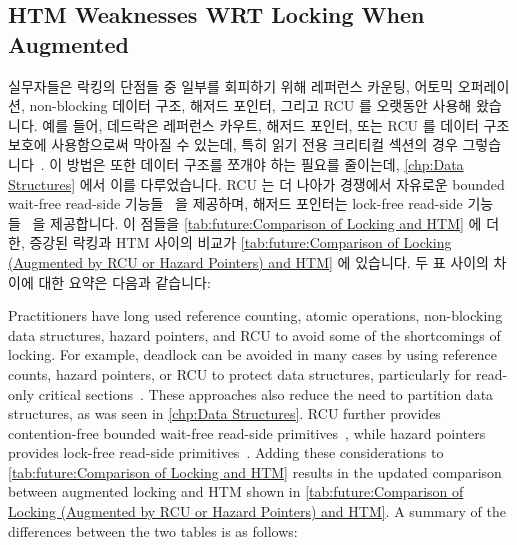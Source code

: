 \fi

\subsection{HTM Weaknesses WRT Locking When Augmented}
\label{sec:future:HTM Weaknesses WRT Locking When Augmented}



실무자들은 락킹의 단점들 중 일부를 회피하기 위해 레퍼런스 카운팅, 어토믹
오퍼레이션, non-blocking 데이터 구조, 해저드 포인터, 그리고 RCU 를 오랫동안
사용해 왔습니다.
예를 들어, 데드락은 레퍼런스 카우트, 해저드 포인터, 또는 RCU 를 데이터 구조
보호에 사용함으로써 막아질 수 있는데, 특히 읽기 전용 크리티컬 섹션의 경우
그렇습니다~\cite{MagedMichael04a,HerlihyLM02,MathieuDesnoyers2012URCU,DinakarGuniguntala2008IBMSysJ,ThomasEHart2007a}.
이 방법은 또한 데이터 구조를 쪼개야 하는 필요를 줄이는데,
\cref{chp:Data Structures} 에서 이를 다루었습니다.
RCU 는 더 나아가 경쟁에서 자유로운 bounded wait-free read-side
기능들~\cite{McKenney98,MathieuDesnoyers2012URCU} 을 제공하며, 해저드 포인터는
lock-free read-side 기능들~\cite{Michael02a,HerlihyLM02,MagedMichael04a} 을
제공합니다.
이 점들을
\cref{tab:future:Comparison of Locking and HTM}
에 더한, 증강된 락킹과 HTM 사이의 비교가
\cref{tab:future:Comparison of Locking (Augmented by RCU or Hazard Pointers) and HTM}
에 있습니다.
두 표 사이의 차이에 대한 요약은 다음과 같습니다:

\iffalse

Practitioners have long used reference counting, atomic operations,
non-blocking data structures, hazard pointers, and RCU to avoid some
of the shortcomings of locking.
For example, deadlock can be avoided in many cases by using reference
counts, hazard pointers, or RCU to protect data structures,
particularly for read-only critical
sections~\cite{MagedMichael04a,HerlihyLM02,MathieuDesnoyers2012URCU,DinakarGuniguntala2008IBMSysJ,ThomasEHart2007a}.
These approaches also reduce the need to partition data
structures, as was seen in \cref{chp:Data Structures}.
RCU further provides contention-free bounded wait-free read-side
primitives~\cite{McKenney98,MathieuDesnoyers2012URCU}, while hazard pointers
provides lock-free read-side
primitives~\cite{Michael02a,HerlihyLM02,MagedMichael04a}.
Adding these considerations to
\cref{tab:future:Comparison of Locking and HTM}
results in the updated comparison between augmented locking and HTM
shown in
\cref{tab:future:Comparison of Locking (Augmented by RCU or Hazard Pointers) and HTM}.
A summary of the differences between the two tables is as follows:

